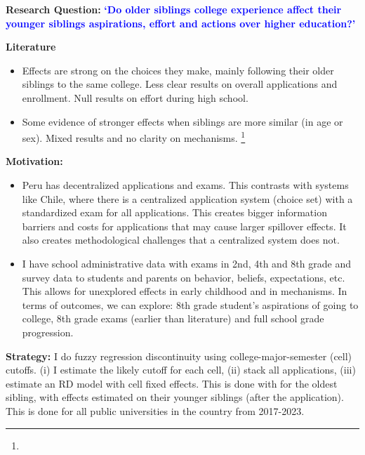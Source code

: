 


\textbf{Research Question:} \textcolor{blue}{\textbf{`Do older siblings college experience affect their younger siblings aspirations, effort and actions over higher education?'}}


\textbf{Literature}
\begin{itemize}
    \item  Effects are strong on the choices they make, mainly following their older siblings to the same college. Less clear results on overall applications and enrollment. Null results on effort during high school.
    \item Some evidence of stronger effects when siblings are more similar (in age or sex). Mixed results and no clarity on mechanisms. \footnote{}
\end{itemize}

\textbf{Motivation:}
\begin{itemize}
    \item Peru has decentralized applications and exams. This contrasts with systems like Chile, where there is a centralized application system (choice set) with a standardized exam for all applications. This creates bigger information barriers and costs for applications that may cause larger spillover effects. It also creates methodological challenges that a centralized system does not.
    \item I have school administrative data with exams in 2nd, 4th and 8th grade and survey data to students and parents on behavior, beliefs, expectations, etc. This allows for unexplored effects in early childhood and in mechanisms. In terms of outcomes, we can explore: 8th grade student's aspirations of going to college, 8th grade exams (earlier than literature) and full school grade progression.
\end{itemize}

\textbf{Strategy:} I do fuzzy regression discontinuity using college-major-semester (cell) cutoffs. (i) I estimate the likely cutoff for each cell, (ii) stack all applications, (iii) estimate an RD model with cell fixed effects. This is done with for the oldest sibling, with effects estimated on their younger siblings (after the application). This is done for all public universities in the country from 2017-2023.

